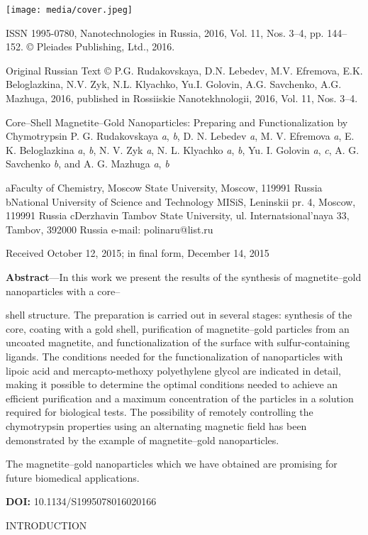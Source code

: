 \documentclass[12pt,a4paper]{article}
\author{Демурин Артём Андреевич \\ }
\date{}
\begin{document}
\texttt{[image: media/cover.jpeg]}

ISSN 1995-0780, Nanotechnologies in Russia, 2016, Vol. 11, Nos. 3--4,
pp. 144--152. © Pleiades Publishing, Ltd., 2016.

Original Russian Text © P.G. Rudakovskaya, D.N. Lebedev, M.V. Efremova,
E.K. Beloglazkina, N.V. Zyk, N.L. Klyachko, Yu.I. Golovin, A.G.
Savchenko, A.G. Mazhuga, 2016, published in Rossiiskie Nanotekhnologii,
2016, Vol. 11, Nos. 3--4.

Сore--Shell Magnetite--Gold Nanoparticles: Preparing and
Functionalization by Chymotrypsin P. G. Rudakovskaya \emph{a}, \emph{b},
D. N. Lebedev \emph{a}, M. V. Efremova \emph{a}, E. K. Beloglazkina
\emph{a}, \emph{b}, N. V. Zyk \emph{a}, N. L. Klyachko \emph{a},
\emph{b}, Yu. I. Golovin \emph{a}, \emph{c}, A. G. Savchenko \emph{b},
and A. G. Mazhuga \emph{a}, \emph{b}

aFaculty of Chemistry, Moscow State University, Moscow, 119991 Russia
bNational University of Science and Technology MISiS, Leninskii pr. 4,
Moscow, 119991 Russia cDerzhavin Tambov State University, ul.
Internatsional'naya 33, Tambov, 392000 Russia e-mail: polinaru@list.ru

Received October 12, 2015; in final form, December 14, 2015

\textbf{Abstract}---In this work we present the results of the synthesis
of magnetite--gold nanoparticles with a core--

shell structure. The preparation is carried out in several stages:
synthesis of the core, coating with a gold shell, purification of
magnetite--gold particles from an uncoated magnetite, and
functionalization of the surface with sulfur-containing ligands. The
conditions needed for the functionalization of nanoparticles with lipoic
acid and mercapto-methoxy polyethylene glycol are indicated in detail,
making it possible to determine the optimal conditions needed to achieve
an efficient purification and a maximum concentration of the particles
in a solution required for biological tests. The possibility of remotely
controlling the chymotrypsin properties using an alternating magnetic
field has been demonstrated by the example of magnetite--gold
nanoparticles.

The magnetite--gold nanoparticles which we have obtained are promising
for future biomedical applications.

\textbf{DOI:} 10.1134/S1995078016020166

INTRODUCTION
\end{document}
